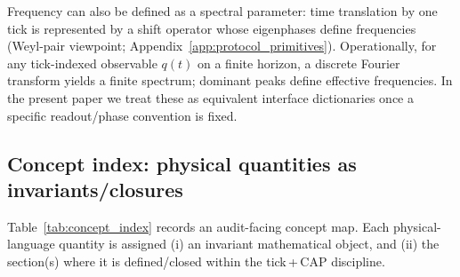 \begin{remark}
\label{rem:frequency_alt_definitions}
Frequency can also be defined as a spectral parameter:
time translation by one tick is represented by a shift operator whose eigenphases define frequencies (Weyl-pair viewpoint; Appendix~\ref{app:protocol_primitives}).
Operationally, for any tick-indexed observable $q(t)$ on a finite horizon, a discrete Fourier transform yields a finite spectrum; dominant peaks define effective frequencies.
In the present paper we treat these as equivalent interface dictionaries once a specific readout/phase convention is fixed.
\end{remark}

\subsection{Concept index: physical quantities as invariants/closures}
\label{subsec:concept_index}

Table~\ref{tab:concept_index} records an audit-facing concept map.
Each physical-language quantity is assigned (i) an invariant mathematical object, and (ii) the section(s) where it is defined/closed within the tick\,+\,CAP discipline.

